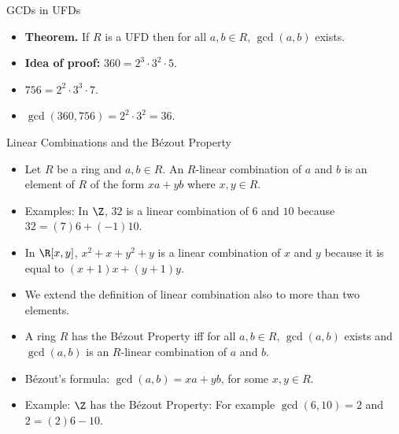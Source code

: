 \documentclass[handout]{beamer}
\begin{document}

\begin{frame}{GCDs in UFDs}

\begin{itemize}
  \item \textbf{Theorem.} If $R$ is a UFD then for all $a,b\in R$, $\gcd(a,b)$ exists.
  \item \textbf{Idea of proof:} $360 = 2^3  \cdot 3^2  \cdot 5$.
  \item $756 = 2^2 \cdot 3^3 \cdot 7$.
  \item $\gcd(360,756) = 2^2 \cdot 3^2 = 36$.
\end{itemize}

\end{frame}



\begin{frame}{Linear Combinations and the B\'{e}zout Property}

\begin{itemize}
  \item Let $R$ be a ring and $a,b\in R$. An $R$-linear combination of $a$ and $b$ is an element of $R$ of the form
  $xa+yb$ where $x,y\in R$.
  \item Examples: In $\Z$, $32$ is a linear combination of $6$ and $10$ because $32 = (7)6 + (-1)10$.
  \item In $\R[x,y]$, $x^2 + x + y^2 +y$ is a linear combination of $x$ and $y$ because it is equal to $(x+1)x + (y+1)y$.
  \item We extend the definition of linear combination also to more than two elements.
  \item A ring $R$ has the B\'{e}zout Property iff for all $a,b\in R$, $\gcd(a,b)$ exists and $\gcd(a,b)$ is an $R$-linear
  combination of $a$ and $b$.
  \item B\'{e}zout's formula: $\gcd(a,b) = xa + yb$, for some $x,y\in R$.
  \item Example: $\Z$ has the B\'{e}zout Property: For example $\gcd(6,10) = 2$ and $2=(2)6 - 10$.
\end{itemize}

\end{frame}


\end{document}
